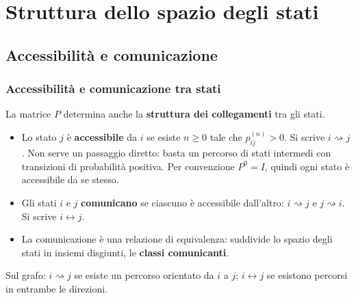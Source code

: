 \documentclass[handout]{beamer}%
\newenvironment{stepitemize}{\begin{itemize}[<+->]}{\end{itemize} }
\providecommand{\QTR}[2]{\csname #1\endcsname{#2}}
\begin{document}


\section{Struttura dello spazio degli stati}

\subsection{Accessibilit\`{a} e comunicazione}%

\begin{frame}%
%

\frametitle{Accessibilit\`{a} e comunicazione tra stati}%
%

%


La matrice $P$ determina anche la \textbf{struttura dei collegamenti} tra gli stati.

\medskip

\begin{stepitemize}
\item Lo stato $j$ \`{e} \textbf{accessibile} da $i$ se esiste $n\geq0$ tale
che $p_{ij}^{(n)}>0$. Si scrive $i\rightsquigarrow j$. Non serve un passaggio
diretto: basta un percorso di stati intermedi con transizioni di
probabilit\`{a} positiva. Per convenzione $P^{0}=I$, quindi ogni stato \`{e}
accessibile da se stesso.

\item Gli stati $i$ e $j$ \textbf{comunicano} se ciascuno \`{e} accessibile
dall'altro: $i\rightsquigarrow j$ e $j\rightsquigarrow i$. Si scrive
$i\leftrightarrow j$.

\item La comunicazione \`{e} una relazione di equivalenza: suddivide lo spazio
degli stati in insiemi disgiunti, le \textbf{classi comunicanti}.
\end{stepitemize}

\medskip

\begin{center}
{\small Sul grafo: $i\rightsquigarrow j$ se esiste un percorso orientato da
$i$ a $j$; $i\leftrightarrow j$ se esistono percorsi in entrambe le
direzioni.}
\end{center}%

\transboxout
\end{frame}%
\end{document}
